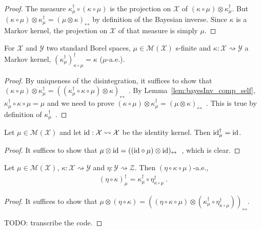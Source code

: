 \begin{proof}\leanok
\uses{}
The measure $\kappa_\mu^\dagger \circ (\kappa \circ \mu)$ is the projection on $\mathcal X$ of $(\kappa \circ \mu) \otimes \kappa_\mu^\dagger$. But $(\kappa \circ \mu) \otimes \kappa_\mu^\dagger = (\mu \otimes \kappa)_\leftrightarrow$ by definition of the Bayesian inverse. Since $\kappa$ is a Markov kernel, the projection on $\mathcal X$ of that measure is simply $\mu$.
\end{proof}

\begin{lemma}
  \label{lem:bayesInv_self}
  \leanok
  For $\mathcal X$ and $\mathcal Y$ two standard Borel spaces, $\mu \in \mathcal M(\mathcal X)$ s-finite and $\kappa : \mathcal X \rightsquigarrow \mathcal Y$ a Markov kernel, $(\kappa_\mu^\dagger)_{\kappa \circ \mu}^\dagger = \kappa$ ($\mu$-a.e.).
\end{lemma}

\begin{proof}\leanok
{}
By uniqueness of the disintegration, it suffices to show that $(\kappa \circ \mu) \otimes \kappa_\mu^\dagger = ((\kappa_\mu^\dagger \circ \kappa \circ \mu) \otimes \kappa)_\leftrightarrow$~.
By Lemma~\ref{lem:bayesInv_comp_self}, $\kappa_\mu^\dagger \circ \kappa \circ \mu = \mu$ and we need to prove $(\kappa \circ \mu) \otimes \kappa_\mu^\dagger = (\mu \otimes \kappa)_\leftrightarrow$~.
This is true by definition of $\kappa_\mu^\dagger$~.
\end{proof}

\begin{lemma}
  \label{lem:bayesInv_id}
  \leanok
  Let $\mu \in \mathcal M (\mathcal X)$ and let $\textup{id} : \mathcal X \rightsquigarrow \mathcal X$ be the identity kernel. Then $\textup{id}_\mu^\dagger = \textup{id}$.
\end{lemma}

\begin{proof}\leanok
{}
It suffices to show that $\mu \otimes \textup{id} = ((\textup{id} \circ \mu) \otimes \textup{id})_\leftrightarrow$~, which is clear.
\end{proof}

\begin{lemma}
  \label{lem:bayesInv_comp}
  \leanok
  Let $\mu \in \mathcal M(\mathcal X)$, $\kappa : \mathcal X \rightsquigarrow \mathcal Y$ and $\eta : \mathcal Y \rightsquigarrow \mathcal Z$. Then $(\eta \circ \kappa \circ \mu)$-a.e.,
  \begin{align*}
  (\eta \circ \kappa)_\mu^\dagger = \kappa_{\mu}^\dagger \circ \eta_{\kappa \circ \mu}^\dagger
  \: .
  \end{align*}
\end{lemma}

\begin{proof}\leanok
{}
It suffices to show that $\mu \otimes (\eta \circ \kappa) = ((\eta \circ \kappa \circ \mu) \otimes (\kappa_{\mu}^\dagger \circ \eta_{\kappa \circ \mu}^\dagger))_\leftrightarrow$.

TODO: transcribe the code.
\end{proof}
